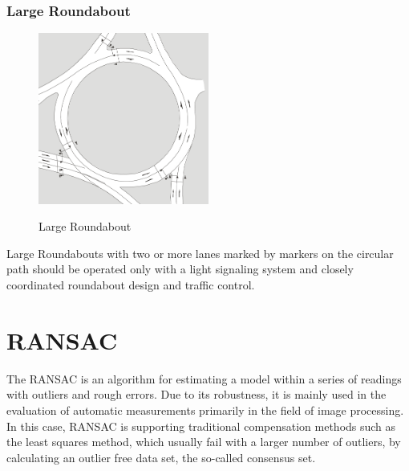 \subsubsection{Large Roundabout}


\begin{figure}[!ht]
\caption{Large Roundabout \cite{man06}}
\includegraphics[width=0.5\textwidth]{bilder/large_roundabout.png} %
\label{roundabout_large}
\end{figure}

Large Roundabouts with two or more lanes marked by markers on the circular path should be operated only with a light signaling system and closely coordinated roundabout design and traffic control.\cite{man06}


\section{\acl{RANSAC}}

The \ac{RANSAC} \cite{Fischler1981} is an algorithm for estimating a model within a series of readings with outliers and rough errors. Due to its robustness, 
it is mainly used in the evaluation of automatic measurements primarily in the field of image processing. 
In this case, \ac{RANSAC} is supporting traditional compensation methods such as the least squares method, which usually fail with a larger number of outliers,
by calculating an outlier free data set, the so-called consensus set. 

